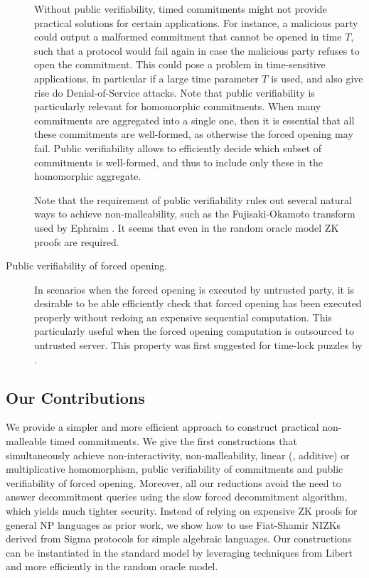 \begin{description}
	Without public verifiability, timed commitments might not provide practical solutions for certain applications. For instance, a malicious party could output a malformed commitment that cannot be opened in time $T$, such that a protocol would fail again in case the malicious party refuses to open the commitment. This could pose a problem in time-sensitive applications, in particular if a large time parameter $T$ is used, and also give rise do Denial-of-Service attacks.
	Note that public verifiability is particularly relevant for homomorphic commitments. When many commitments are aggregated into a single one, then it is essential that all these commitments are well-formed, as otherwise the forced opening may fail. Public verifiability allows to efficiently decide which subset of commitments is well-formed, and thus to include only these in the homomorphic aggregate.

	Note that the requirement of public verifiability rules out several natural ways to achieve non-malleability, such as the Fujisaki-Okamoto transform \cite{C:FujOka99,JC:FujOka13} used by Ephraim \etal \cite{EPRINT:EFKP20a}. It seems that even in the random oracle model ZK proofs are required.
	\item[Public verifiability of forced opening.] In scenarios when the forced opening is executed by untrusted party, it is desirable to be able efficiently check that forced opening has been executed properly without redoing an expensive sequential computation. This particularly useful when the forced opening computation is outsourced to untrusted server. This property was first suggested for time-lock puzzles by \cite{EPRINT:EFKP20a}. 
\end{description}









\subsection{Our Contributions}

We provide a simpler and more efficient approach to construct practical non-malleable timed commitments. We give the first constructions that simultaneously achieve non-interactivity, non-malleability, linear (\ie, additive) or multiplicative homomorphism, public verifiability of commitments and public verifiability of forced opening. Moreover, all our reductions avoid the need to answer decommitment queries using the slow forced decommitment algorithm, which yields much tighter security.
Instead of relying on expensive ZK proofs for general NP languages as prior work, we show how to use Fiat-Shamir \cite{C:FiaSha86} NIZKs derived from Sigma protocols for simple algebraic languages. Our constructions can be instantiated in the standard model by leveraging techniques from Libert \etal \cite{Libert2021OneShotFN} and more efficiently in the random oracle model.

